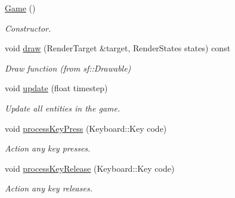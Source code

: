 \begin{DoxyCompactItemize}
\item 
\hypertarget{class_game_ad59df6562a58a614fda24622d3715b65}{}\hyperlink{class_game_ad59df6562a58a614fda24622d3715b65}{Game} ()\label{class_game_ad59df6562a58a614fda24622d3715b65}

\begin{DoxyCompactList}\small\item\em Constructor. \end{DoxyCompactList}\item 
\hypertarget{class_game_a260c4d5123eb3a51cbd0bb685546cef4}{}void \hyperlink{class_game_a260c4d5123eb3a51cbd0bb685546cef4}{draw} (Render\+Target \&target, Render\+States states) const \label{class_game_a260c4d5123eb3a51cbd0bb685546cef4}

\begin{DoxyCompactList}\small\item\em Draw function (from sf\+::\+Drawable) \end{DoxyCompactList}\item 
\hypertarget{class_game_acc8519c7ced1cf9eb9bbb3a2f325f6a0}{}void \hyperlink{class_game_acc8519c7ced1cf9eb9bbb3a2f325f6a0}{update} (float timestep)\label{class_game_acc8519c7ced1cf9eb9bbb3a2f325f6a0}

\begin{DoxyCompactList}\small\item\em Update all entities in the game. \end{DoxyCompactList}\item 
\hypertarget{class_game_ad3053e3b15bbcb049dc040801d58be7c}{}void \hyperlink{class_game_ad3053e3b15bbcb049dc040801d58be7c}{process\+Key\+Press} (Keyboard\+::\+Key code)\label{class_game_ad3053e3b15bbcb049dc040801d58be7c}

\begin{DoxyCompactList}\small\item\em Action any key presses. \end{DoxyCompactList}\item 
\hypertarget{class_game_adb2ea3b70e0038d2caceedfde3bfc663}{}void \hyperlink{class_game_adb2ea3b70e0038d2caceedfde3bfc663}{process\+Key\+Release} (Keyboard\+::\+Key code)\label{class_game_adb2ea3b70e0038d2caceedfde3bfc663}

\begin{DoxyCompactList}\small\item\em Action any key releases. \end{DoxyCompactList}\end{DoxyCompactItemize}

